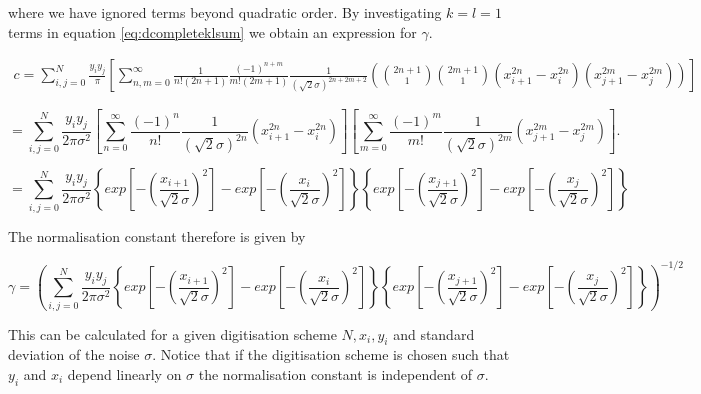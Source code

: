 \documentclass[apj]{emulateapj}
\begin{document}
where we have ignored terms beyond quadratic order. By investigating $k=l=1$ terms in equation \ref{eq:dcompleteklsum} we obtain an expression for $\gamma$.

\begin{equation}
\begin{aligned}
c = \sum_{i,j=0}^N  \frac{y_i y_j}{\pi} \left[ \sum_{n,m = 0}^\infty \frac{1}{n! (2n+1)} \frac{(-1)^{n+m}}{m! (2m+1)} \frac{1}{(\sqrt{2}\sigma)^{2n+2m+2}} \left( {2n+1 \choose 1} {2m+1 \choose 1} ( x_{i+1}^{2n} - x_{i}^{2n} ) ( x_{j+1}^{2m} - x_{j}^{2m} ) \right) \right]
\end{aligned}
\end{equation}

\begin{equation}
= \sum_{i,j=0}^N \frac{y_i y_j}{2\pi\sigma^2} \left[ \sum_{n = 0}^\infty \frac{(-1)^n}{n!} \frac{1}{(\sqrt{2}\sigma)^{2n}}  ( x_{i+1}^{2n} - x_{i}^{2n} ) \right] \left[ \sum_{m = 0}^\infty \frac{(-1)^m}{m!} \frac{1}{(\sqrt{2}\sigma)^{2m}} ( x_{j+1}^{2m} - x_{j}^{2m} ) \right].
\end{equation}

\begin{equation}
= \sum_{i,j=0}^N \frac{y_i y_j}{2\pi\sigma^2} \left\{ exp \left[ - \left(\frac{x_{i+1}}{\sqrt{2}\sigma} \right)^2 \right] - exp \left[ - \left(\frac{x_{i}}{\sqrt{2}\sigma} \right)^2 \right] \right\} \left\{ exp \left[ - \left(\frac{x_{j+1}}{\sqrt{2}\sigma} \right)^2 \right] - exp \left[ - \left(\frac{x_{j}}{\sqrt{2}\sigma} \right)^2 \right] \right\}
\end{equation}

The normalisation constant therefore is given by

\begin{equation}
\gamma = \left( \sum_{i,j=0}^N \frac{y_i y_j}{2\pi\sigma^2} \left\{ exp \left[ - \left(\frac{x_{i+1}}{\sqrt{2}\sigma} \right)^2 \right] - exp \left[ - \left(\frac{x_{i}}{\sqrt{2}\sigma} \right)^2 \right] \right\} \left\{ exp \left[ - \left(\frac{x_{j+1}}{\sqrt{2}\sigma} \right)^2 \right] - exp \left[ - \left(\frac{x_{j}}{\sqrt{2}\sigma} \right)^2 \right] \right\} \right)^{-1/2}
\end{equation}

This can be calculated for a given digitisation scheme $N, x_i, y_i$ and standard deviation of the noise $\sigma$. Notice that if the digitisation scheme is chosen such that $y_i$ and $x_i$ depend linearly on $\sigma$ the normalisation constant is independent of $\sigma$.




\end{document}
